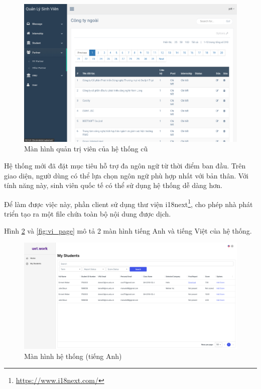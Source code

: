\documentclass[./../main.tex]{subfiles}
\begin{document}
\begin{figure}[]
	\includegraphics[width=\linewidth]{./images/old_admin_page.png}
	\caption{Màn hình quản trị viên của hệ thống cũ}
	\label{fig:old_admin_page}
\end{figure}

Hệ thống mới đã đặt mục tiêu hỗ trợ đa ngôn ngữ từ thời điểm ban đầu. Trên giao diện, ngườ dùng có thể lựa chọn ngôn ngữ phù hợp nhất với bản thân. Với tính năng này, sinh viên quốc tế có thể sử dụng hệ thống dễ dàng hơn.

Để làm được việc này, phần client sử dụng thư viện i18next\footnote{\url{https://www.i18next.com/}}, cho phép nhà phát triển tạo ra một file chứa toàn bộ nội dung được dịch.

Hình \ref{fig:en_page} và \ref{fig:vi_page} mô tả 2 màn hình tiếng Anh và tiếng Việt của hệ thống.

\begin{figure}[]
	\includegraphics[width=\linewidth]{./images/image13.png}
	\caption{Màn hình hệ thống (tiếng Anh)}
	\label{fig:en_page}
\end{figure}
\end{document}

